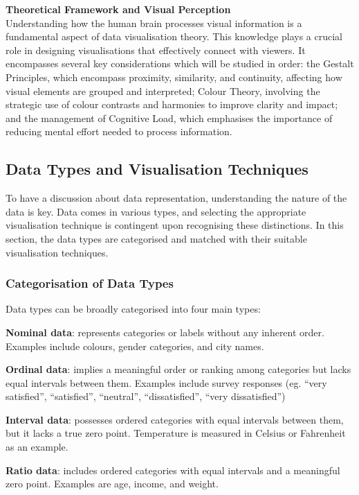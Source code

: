 \documentclass{article}\usepackage[]{graphicx}\usepackage[]{xcolor}
\numberwithin{equation}{section}
\begin{document}
\noindent \textbf{Theoretical Framework and Visual Perception}\\
Understanding how the human brain processes visual information is a fundamental aspect of data visualisation theory. This knowledge plays a crucial role in designing visualisations that effectively connect with viewers. It encompasses several key considerations which will be studied in order: the Gestalt Principles, which encompass proximity, similarity, and continuity, affecting how visual elements are grouped and interpreted; Colour Theory, involving the strategic use of colour contrasts and harmonies to improve clarity and impact; and the management of Cognitive Load, which emphasises the importance of reducing mental effort needed to process information.

\subsection{Data Types and Visualisation Techniques}
To have a discussion about data representation, understanding the nature of the data is key. Data comes in various types, and selecting the appropriate visualisation technique is contingent upon recognising these distinctions. In this section, the data types are categorised and matched with their suitable visualisation techniques.

\subsubsection{Categorisation of Data Types}
Data types can be broadly categorised into four main types: 
\begin{itemise}
    \item \textbf{Nominal data}: represents categories or labels without any inherent order. Examples include colours, gender categories, and city names. 
    \item \textbf{Ordinal data}: implies a meaningful order or ranking among categories but lacks equal intervals between them. Examples include survey responses (eg. “very satisfied”, “satisfied”, “neutral”, “dissatisfied”, “very dissatisfied”)
    \item \textbf{Interval data}: possesses ordered categories with equal intervals between them, but it lacks a true zero point. Temperature is measured in Celsius or Fahrenheit as an example. 
    \item \textbf{Ratio data}: includes ordered categories with equal intervals and a meaningful zero point. Examples are age, income, and weight. 
\end{itemise}
\end{document}
